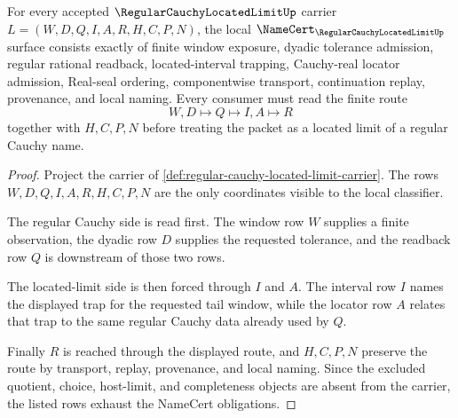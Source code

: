 \begin{theorem}
\label{thm:regular-cauchy-located-limit-namecert-obligations}
For every accepted $\RegularCauchyLocatedLimitUp$ carrier $L=(W,D,Q,I,A,R,H,C,P,N)$, the local $\NameCert_{\RegularCauchyLocatedLimitUp}$ surface consists exactly of finite window exposure, dyadic tolerance admission, regular rational readback, located-interval trapping, Cauchy-real locator admission, Real-seal ordering, componentwise transport, continuation replay, provenance, and local naming. Every consumer must read the finite route
$$
W,D \longmapsto Q \longmapsto I,A \longmapsto R
$$
together with $H,C,P,N$ before treating the packet as a located limit of a regular Cauchy name.
\end{theorem}
\begin{proof}
Project the carrier of \autoref{def:regular-cauchy-located-limit-carrier}. The rows $W,D,Q,I,A,R,H,C,P,N$ are the only coordinates visible to the local classifier.

The regular Cauchy side is read first. The window row $W$ supplies a finite observation, the dyadic row $D$ supplies the requested tolerance, and the readback row $Q$ is downstream of those two rows.

The located-limit side is then forced through $I$ and $A$. The interval row $I$ names the displayed trap for the requested tail window, while the locator row $A$ relates that trap to the same regular Cauchy data already used by $Q$.

Finally $R$ is reached through the displayed route, and $H,C,P,N$ preserve the route by transport, replay, provenance, and local naming. Since the excluded quotient, choice, host-limit, and completeness objects are absent from the carrier, the listed rows exhaust the NameCert obligations.
\end{proof}

